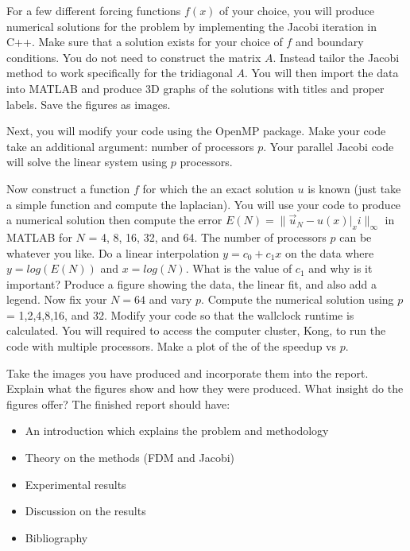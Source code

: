 \documentclass{article}
\begin{document}
For a few different forcing functions $f(x)$ of your choice, you will produce numerical solutions for the problem by implementing the Jacobi iteration in C++. Make sure that a solution exists for your choice of $f$ and boundary conditions. You do not need to construct the matrix $A$. Instead tailor the Jacobi method to work specifically for the tridiagonal $A$. You will then import the data into MATLAB and produce 3D graphs of the solutions with titles and proper labels. Save the figures as images.

Next, you will modify your code using the OpenMP package. Make your code take an additional argument: number of processors $p$. Your parallel Jacobi code will solve the linear system using $p$ processors.

Now construct a function $f$ for which the an exact solution $u$ is known (just take a simple function and compute the laplacian). You will use your code to produce a numerical solution then compute the error $E(N)=\|\Vec{u}_N-u(x)|_xi\|_{\infty}$ in MATLAB for $N$ = 4, 8, 16, 32, and 64. The number of processors $p$ can be whatever you like. Do a linear interpolation $y=c_0 + c_1 x$ on the data where $y=log(E(N))$ and $x = log(N)$. What is the value of $c_1$ and why is it important? Produce a figure showing the data, the linear fit, and also add a legend. Now fix your $N=64$ and vary $p$. Compute the numerical solution using $p$ = 1,2,4,8,16, and 32. Modify your code so that the wallclock runtime is calculated. You will required to access the computer cluster, Kong, to run the code with multiple processors. Make a plot of the of the speedup vs $p$.

Take the images you have produced and incorporate them into the report. Explain what the figures show and how they were produced. What insight do the figures offer? The finished report should have:
\begin{itemize}
    \item An introduction which explains the problem and methodology
    \item Theory on the methods (FDM and Jacobi)
    \item Experimental results
    \item Discussion on the results
    \item Bibliography
\end{itemize}
\end{document}
